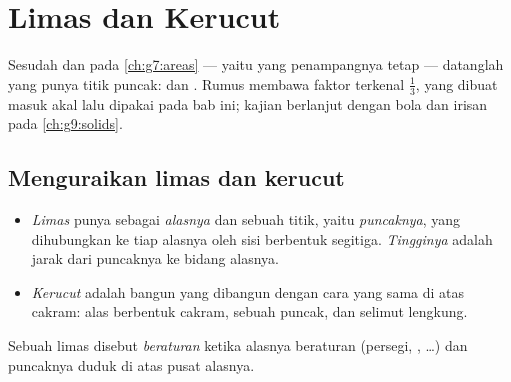 \chapter{Limas dan Kerucut}\label{ch:g8:solids}

Sesudah  dan  pada \cref{ch:g7:areas} --- yaitu  yang penampangnya tetap --- datanglah  yang punya
titik puncak:  dan . Rumus  membawa faktor
terkenal $\frac13$, yang dibuat masuk akal lalu dipakai pada bab ini;
kajian  berlanjut dengan bola dan irisan pada
\cref{ch:g9:solids}.

\section{Menguraikan limas dan kerucut}

\begin{definition}\label{def:g8:solids:def}
\begin{itemize}
  \item \emph{Limas} punya  sebagai
        \emph{alasnya} dan sebuah titik, yaitu \emph{puncaknya}, yang
        dihubungkan ke tiap  alasnya oleh sisi berbentuk
        segitiga. \emph{Tingginya} adalah jarak dari puncaknya ke
        bidang alasnya.
  \item \emph{Kerucut} adalah bangun yang dibangun
        dengan cara yang sama di atas cakram: alas berbentuk cakram,
        sebuah puncak, dan selimut lengkung.
\end{itemize}
Sebuah limas disebut \emph{beraturan} ketika alasnya 
beraturan (persegi, , \dots) dan puncaknya duduk
 di atas pusat alasnya.
\end{definition}

